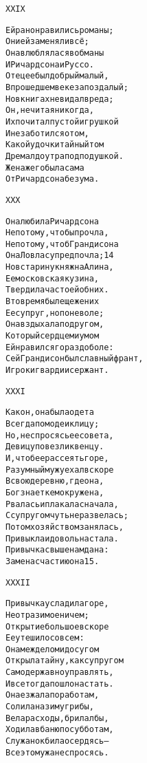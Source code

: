 \begin{minipage}[t]{\dimexpr 0.5\textwidth -\tabcolsep-.5pt}
\begin{alltt}\normalfont\centering
XXIX

Ей рано нравились романы;
Они ей заменяли всё;
Она влюблялася в обманы
И Ричардсона и Руссо.
Отец ее был добрый малый,
В прошедшем веке запоздалый;
Но в книгах не видал вреда;
Он, не читая никогда,
Их почитал пустой игрушкой
И не заботился о том,
Какой у дочки тайный том
Дремал до утра под подушкой.
Жена ж его была сама
От Ричардсона без ума.
\end{alltt}
\end{minipage}

\begin{minipage}[t]{\dimexpr 0.5\textwidth -\tabcolsep-.5pt}
\begin{alltt}\normalfont\centering
XXX

Она любила Ричардсона
Не потому, чтобы прочла,
Не потому, чтоб Грандисона
Она Ловласу предпочла; 14
Но в старину княжна Алина,
Ее московская кузина,
Твердила часто ей об них.
В то время был еще жених
Ее супруг, но по неволе;
Она вздыхала по другом,
Который сердцем и умом
Ей нравился гораздо боле:
Сей Грандисон был славный франт,
Игрок и гвардии сержант.
\end{alltt}
\end{minipage}
\clearpage

\begin{minipage}[t]{\dimexpr 0.5\textwidth -\tabcolsep-.5pt}
\begin{alltt}\normalfont\centering
XXXI

Как он, она была одета
Всегда по моде и к лицу;
Но, не спросясь ее совета,
Девицу повезли к венцу.
И, чтоб ее рассеять горе,
Разумный муж уехал вскоре
В свою деревню, где она,
Бог знает кем окружена,
Рвалась и плакала сначала,
С супругом чуть не развелась;
Потом хозяйством занялась,
Привыкла и довольна стала.
Привычка свыше нам дана:
Замена счастию она 15.
\end{alltt}
\end{minipage}

\begin{minipage}[t]{\dimexpr 0.5\textwidth -\tabcolsep-.5pt}
\begin{alltt}\normalfont\centering
XXXII

Привычка усладила горе,
Не отразимое ничем;
Открытие большое вскоре
Ее утешило совсем:
Она меж делом и досугом
Открыла тайну, как супругом
Самодержавно управлять,
И все тогда пошло на стать.
Она езжала по работам,
Солила на зиму грибы,
Вела расходы, брила лбы,
Ходила в баню по субботам,
Служанок била осердясь —
Все это мужа не спросясь.
\end{alltt}
\end{minipage}
\clearpage

